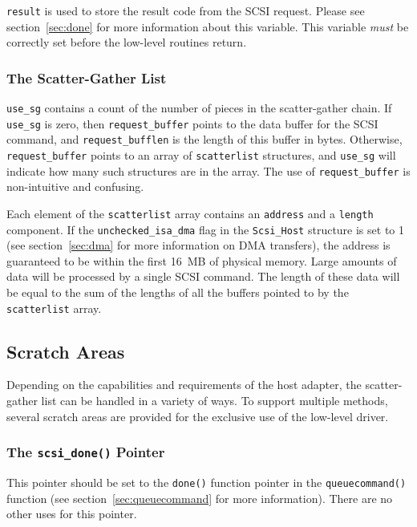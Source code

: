 \verb|result| is used to store the result code from the SCSI request.
Please see section~\ref{sec:done} for more information about this variable.
This variable {\em must\/} be correctly set before the low-level routines
return.


\subsubsection{The Scatter-Gather List}

\verb|use_sg| contains a count of the number of pieces in the
scatter-gather chain.  If \verb|use_sg| is zero, then \verb|request_buffer|
points to the data buffer for the SCSI command, and \verb|request_bufflen|
is the length of this buffer in bytes.  Otherwise, \verb|request_buffer|
points to an array of \verb|scatterlist| structures, and \verb|use_sg| will
indicate how many such structures are in the array.  The use of
\verb|request_buffer| is non-intuitive and confusing.

Each element of the \verb|scatterlist| array contains an \verb|address| and
a \verb|length| component.  If the \verb|unchecked_isa_dma| flag in the
\verb|Scsi_Host| structure is set to 1 (see section~\ref{sec:dma} for more
information on DMA transfers), the address is guaranteed to be within
the first 16~MB of physical memory.  Large amounts of data will be processed
by a single SCSI command.  The length of these data will be equal to the sum
of the lengths of all the buffers pointed to by the \verb|scatterlist|
array.



\subsection{Scratch Areas}

Depending on the capabilities and requirements of the host adapter, the
scatter-gather list can be handled in a variety of ways.  To support
multiple methods, several scratch areas are provided for the exclusive use
of the low-level driver.

\subsubsection{The {\tt scsi\_done()} Pointer}

This pointer should be set to the \verb|done()| function pointer in the
\verb|queuecommand()| function (see section~\ref{sec:queuecommand} for more
information).  There are no other uses for this pointer.

